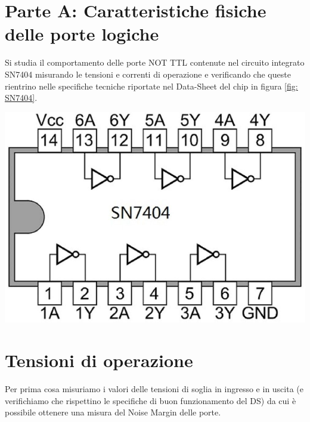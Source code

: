 \documentclass[10pt, a4paper, italian]{article}
\begin{document}
\section*{Parte A: Caratteristiche fisiche delle porte logiche}
\begin{minipage}{0.7\textwidth}
	Si studia il comportamento delle porte NOT TTL contenute nel circuito integrato SN7404 misurando le tensioni e correnti di operazione e verificando che queste rientrino nelle specifiche tecniche riportate nel Data-Sheet del chip in figura \ref{fig: SN7404}.
\end{minipage}
\begin{minipage}{0.3\textwidth}
    	\includegraphics[width=\textwidth]{SN7404}
\end{minipage}
\newline
\section{Tensioni di operazione}\label{sec: tens}
Per prima cosa misuriamo i valori delle tensioni di soglia in ingresso e in
uscita (e verifichiamo che rispettino le specifiche di buon funzionamento del
DS) da cui è possibile ottenere una misura del Noise Margin delle porte.
\end{document}
